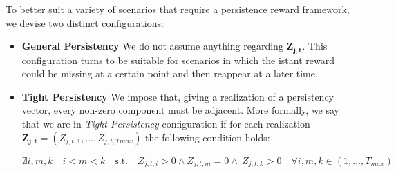 To better suit a variety of scenarios that require a persistence reward framework, we devise two distinct configurations:
\begin{itemize}
	\item \textbf{General Persistency} We do not assume anything regarding $\boldsymbol{Z_{j,t}}$. This configuration turns to be suitable for scenarios in which the istant reward could be missing at a certain point and then reappear at a later time. 
	
	\item \textbf{Tight Persistency} We impose that, giving a realization of a persistency vector, every non-zero component must be adjacent. More formally, we say that we are in \emph{Tight Persistency} configuration if for each realization $\boldsymbol{Z_{j,t}}= (Z_{j,t,1},\dots, Z_{j,t,Tmax})$ the following condition holds:
	\begin{center}
		$\nexists i,m,k  \quad i<m<k\quad \text{s.t.}\quad Z_{j,t,i}>0 \wedge Z_{j,t,m}=0 \wedge \ Z_{j,t,k}>0 \quad \forall i,m,k 	\in (1,\dots,T_{max})$
	\end{center}
\end{itemize}







